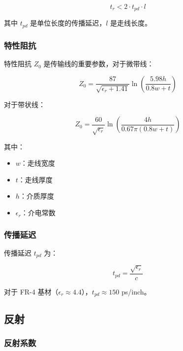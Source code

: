 \begin{equation}
t_r < 2 \cdot t_{pd} \cdot l \label{eq:transmission-line-condition}
\end{equation}

其中 $t_{pd}$ 是单位长度的传播延迟，$l$ 是走线长度。

\subsubsection{特性阻抗}

特性阻抗 $Z_0$ 是传输线的重要参数，对于微带线：

\begin{equation}
Z_0 = \frac{87}{\sqrt{\epsilon_r + 1.41}} \ln\left(\frac{5.98h}{0.8w + t}\right) \label{eq:microstrip-impedance}
\end{equation}

对于带状线：

\begin{equation}
Z_0 = \frac{60}{\sqrt{\epsilon_r}} \ln\left(\frac{4h}{0.67\pi(0.8w + t)}\right) \label{eq:stripline-impedance}
\end{equation}

其中：
\begin{itemize}
  \item $w$：走线宽度
  \item $t$：走线厚度
  \item $h$：介质厚度
  \item $\epsilon_r$：介电常数
\end{itemize}

\subsubsection{传播延迟}

传播延迟 $t_{pd}$ 为：

\begin{equation}
t_{pd} = \frac{\sqrt{\epsilon_r}}{c} \label{eq:propagation-delay}
\end{equation}

对于 FR-4 基材（$\epsilon_r \approx 4.4$），$t_{pd} \approx 150$ ps/inch。

\subsection{反射}

\subsubsection{反射系数}

